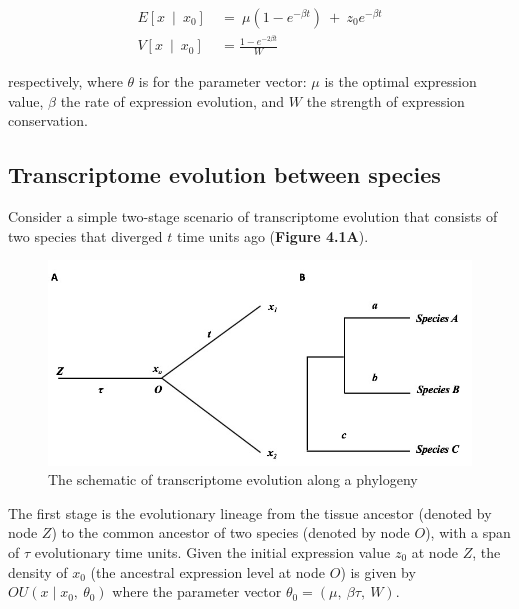 \documentclass[]{book}
\begin{document}
\[
\begin{split}
E\left[x\  \mid\  x_0\right]\  &=\  \mu\left(1-e^{-\beta t}\right)\  +\  z_0e^{-\beta t} \\
V\left[x\  \mid\  x_0\right]\  &=\frac{1-e^{-2\beta t}}{W}
\end{split}\tag{1.1}
\]

respectively, where \(\theta\) is for the parameter vector: \(\mu\) is the optimal expression value, \(\beta\) the rate of expression evolution, and \(W\) the strength of expression conservation.

\hypertarget{transcriptome-evolution-between-species}{%
\subsection{Transcriptome evolution between species}\label{transcriptome-evolution-between-species}}

Consider a simple two-stage scenario of transcriptome evolution that consists of two species that diverged \(t\) time units ago (\textbf{Figure 4.1A}).

\begin{figure}
\includegraphics[width=0.9\linewidth]{Figure1} \caption{The schematic of transcriptome evolution along a phylogeny}\label{fig:unnamed-chunk-14}
\end{figure}

The first stage is the evolutionary lineage from the tissue ancestor (denoted by node \(Z\)) to the common ancestor of two species (denoted by node \(O\)), with a span of \(\tau\) evolutionary time units. Given the initial expression value \(z_0\) at node \(Z\), the density of \(x_0\) (the ancestral expression level at node \(O\)) is given by \(OU\left(x\mid x_0,\  \theta_0\right)\) where the parameter vector \(\theta_{0}=\left(\mu,\  \beta\tau,\  W\right)\).
\end{document}
